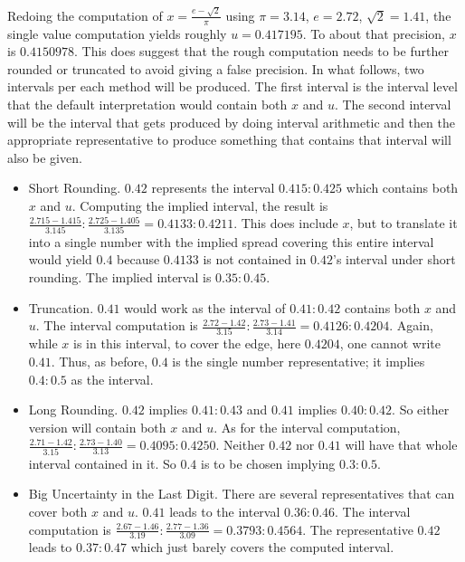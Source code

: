 \documentclass[12pt]{article}
\begin{document}
Redoing the computation of $x = \frac{e-\sqrt{2}}{\pi}$  using $\pi = 3.14$, $e=2.72$, $\sqrt{2} = 1.41$, the single value computation yields roughly $u = 0.417195$. To about that precision, $x$ is $0.4150978$. This does suggest that the rough computation needs to be further rounded or truncated to avoid giving a false precision. In what follows, two intervals per each method will be produced. The first interval is the interval level that the default interpretation would contain both $x$ and $u$. The second interval will be the interval that gets produced by doing interval arithmetic and then the appropriate representative to produce something that contains that interval will also be given. 

\begin{itemize}
    \item Short Rounding. $0.42$ represents the interval $0.415:0.425$ which contains both $x$ and $u$.  Computing the implied interval, the result is $\frac{2.715-1.415}{3.145}: \frac{2.725-1.405}{3.135} = 0.4133:0.4211$. This does include $x$, but to translate it into a single number with the implied spread covering this entire interval would yield $0.4$ because $0.4133$ is not contained in $0.42$'s interval under short rounding. The implied interval is $0.35:0.45$.
    \item Truncation. $0.41$ would work as the interval of $0.41:0.42$ contains both $x$ and $u$. The interval computation is $\frac{2.72 - 1.42}{3.15}:\frac{2.73 - 1.41}{3.14} = 0.4126: 0.4204$. Again, while $x$ is in this interval, to cover the edge, here $0.4204$, one cannot write $0.41$. Thus, as before, $0.4$ is the single number representative; it implies $0.4:0.5$ as the interval. 
    \item Long Rounding. $0.42$ implies $0.41:0.43$ and $0.41$ implies $0.40:0.42$. So either version will contain both $x$ and $u$. As for the interval computation, $\frac{2.71 - 1.42}{3.15}:\frac{2.73 - 1.40}{3.13} = 0.4095: 0.4250$. Neither $0.42$ nor $0.41$ will have that whole interval contained in it. So $0.4$ is to be chosen implying $0.3:0.5$. 
    \item Big Uncertainty in the Last Digit. There are several representatives that can cover both $x$ and $u$. $0.41$ leads to the interval $0.36:0.46$. The interval computation is $\frac{2.67 - 1.46}{3.19}:\frac{2.77 - 1.36}{3.09} = 0.3793: 0.4564$. The representative $0.42$ leads to $0.37:0.47$ which just barely covers the computed interval.  
\end{itemize}
\end{document}
